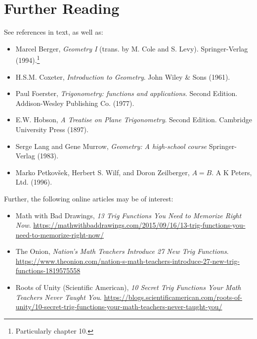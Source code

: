 \documentclass[a4paper,leqno]{article}
\numberwithin{equation}{section}
\theoremstyle{definition}
\theoremstyle{remark}
\begin{document}
\section*{Further Reading}
See references in text, as well as:
\begin{itemize}
  \item Marcel Berger, \emph{Geometry I} (trans. by M. Cole and S. Levy). Springer-Verlag (1994).\footnote{Particularly chapter 10.}
  \item H.S.M. Coxeter, \emph{Introduction to Geometry}. John Wiley \& Sons (1961).
  \item Paul Foerster, \emph{Trigonometry: functions and applications}. Second Edition. Addison-Wesley Publishing Co. (1977).
  \item E.W. Hobson, \emph{A Treatise on Plane Trigonometry}. Second Edition. Cambridge University Press (1897).
  \item Serge Lang and Gene Murrow, \emph{Geometry: A high-school course} Springer-Verlag (1983).
  \item Marko Petkov\v sek, Herbert S. Wilf, and Doron Zeilberger, \emph{$A = B$}. A K Peters, Ltd. (1996).
\end{itemize}

Further, the following online articles may be of interest:
\begin{itemize}
  \item Math with Bad Drawings, \emph{13 Trig Functions You Need to Memorize Right Now}. \url{https://mathwithbaddrawings.com/2015/09/16/13-trig-functions-you-need-to-memorize-right-now/}
  \item The Onion, \emph{Nation's Math Teachers Introduce 27 New Trig Functions}. \url{https://www.theonion.com/nation-s-math-teachers-introduce-27-new-trig-functions-1819575558}
  \item Roots of Unity (Scientific American), \emph{10 Secret Trig Functions Your Math Teachers Never Taught You}. \url{https://blogs.scientificamerican.com/roots-of-unity/10-secret-trig-functions-your-math-teachers-never-taught-you/}
\end{itemize}
\end{document}
